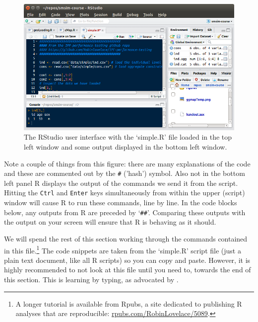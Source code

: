 \documentclass[a4paper, 11pt, twoside]{article}
\begin{document}
\begin{figure}
\begin{center}
\includegraphics[width=15cm]{rs-simple}
\end{center}
\caption{The RStudio user interface with the `simple.R' file loaded in
the top left window and some output displayed in the bottom left window.}
\label{frsimple}
\end{figure}

Note a couple of things from this figure:
there are many explanations of the code and these are commented out
by the \texttt{\#} ('hash') symbol. Also not in the bottom left panel
R displays the output of the commands we send it from the script.
Hitting the \texttt{Ctrl} and \texttt{Enter} keys simultaneously from
within the upper (script) window will cause R to run these commands,
line by line. In the code blocks below, any outputs from R are preceded
by `\texttt{\#\#}'. Comparing these outputs with the output on your screen will
ensure that R is behaving as it should.

We will spend the rest of this section working through
the commands contained in this file.\footnote{A longer
tutorial is available from Rpubs, a site dedicated
to publishing R analyses that are reproducible:
\href{http://rpubs.com/RobinLovelace/5089}{rpubs.com/RobinLovelace/5089}.}
The code snippets are taken from the `simple.R' script file (just a plain text
document, like all R scripts) so you can copy and paste. However, it is
highly recommended to not look at this file until you need to, towards
the end of this
section. This is learning by typing, as advocated by \citet{shaw2013learn}.
\end{document}

